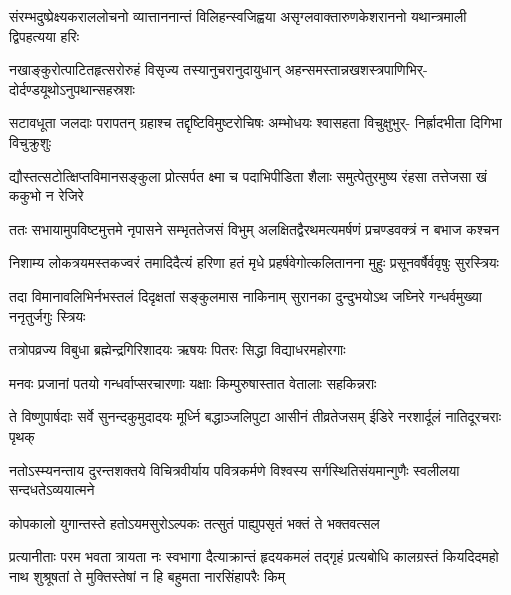 \fourlineindentedshloka
{संरम्भदुष्प्रेक्ष्यकराललोचनो}
{व्यात्ताननान्तं विलिहन्स्वजिह्वया}
{असृग्लवाक्तारुणकेशराननो}
{यथान्त्रमाली द्विपहत्यया हरिः} %

\fourlineindentedshloka
{नखाङ्कुरोत्पाटितहृत्सरोरुहं}
{विसृज्य तस्यानुचरानुदायुधान्}
{अहन्समस्तान्नखशस्त्रपाणिभिर्-}
{दोर्दण्डयूथोऽनुपथान्सहस्रशः} %

\fourlineindentedshloka
{सटावधूता जलदाः परापतन्}
{ग्रहाश्च तद्दृष्टिविमुष्टरोचिषः}
{अम्भोधयः श्वासहता विचुक्षुभुर्-}
{निर्ह्रादभीता दिगिभा विचुक्रुशुः} %

\fourlineindentedshloka
{द्यौस्तत्सटोत्क्षिप्तविमानसङ्कुला}
{प्रोत्सर्पत क्ष्मा च पदाभिपीडिता}
{शैलाः समुत्पेतुरमुष्य रंहसा}
{तत्तेजसा खं ककुभो न रेजिरे} %

\fourlineindentedshloka
{ततः सभायामुपविष्टमुत्तमे}
{नृपासने सम्भृततेजसं विभुम्}
{अलक्षितद्वैरथमत्यमर्षणं}
{प्रचण्डवक्त्रं न बभाज कश्चन} %

\fourlineindentedshloka
{निशाम्य लोकत्रयमस्तकज्वरं}
{तमादिदैत्यं हरिणा हतं मृधे}
{प्रहर्षवेगोत्कलितानना मुहुः}
{प्रसूनवर्षैर्ववृषुः सुरस्त्रियः} %

\fourlineindentedshloka
{तदा विमानावलिभिर्नभस्तलं}
{दिदृक्षतां सङ्कुलमास नाकिनाम्}
{सुरानका दुन्दुभयोऽथ जघ्निरे}
{गन्धर्वमुख्या ननृतुर्जगुः स्त्रियः} %

\twolineshloka
{तत्रोपव्रज्य विबुधा ब्रह्मेन्द्रगिरिशादयः}
{ऋषयः पितरः सिद्धा विद्याधरमहोरगाः} %

\twolineshloka
{मनवः प्रजानां पतयो गन्धर्वाप्सरचारणाः}
{यक्षाः किम्पुरुषास्तात वेतालाः सहकिन्नराः} %

\threelineshloka
{ते विष्णुपार्षदाः सर्वे सुनन्दकुमुदादयः}
{मूर्ध्नि बद्धाञ्जलिपुटा आसीनं तीव्रतेजसम्}
{ईडिरे नरशार्दूलं नातिदूरचराः पृथक्} %




\fourlineindentedshloka
{नतोऽस्म्यनन्ताय दुरन्तशक्तये}
{विचित्रवीर्याय पवित्रकर्मणे}
{विश्वस्य सर्गस्थितिसंयमान्गुणैः}
{स्वलीलया सन्दधतेऽव्ययात्मने} %



\twolineshloka
{कोपकालो युगान्तस्ते हतोऽयमसुरोऽल्पकः}
{तत्सुतं पाह्युपसृतं भक्तं ते भक्तवत्सल} %



\fourlineindentedshloka
{प्रत्यानीताः परम भवता त्रायता नः स्वभागा}
{दैत्याक्रान्तं हृदयकमलं तद्गृहं प्रत्यबोधि}
{कालग्रस्तं कियदिदमहो नाथ शुश्रूषतां ते}
{मुक्तिस्तेषां न हि बहुमता नारसिंहापरैः किम्} %



